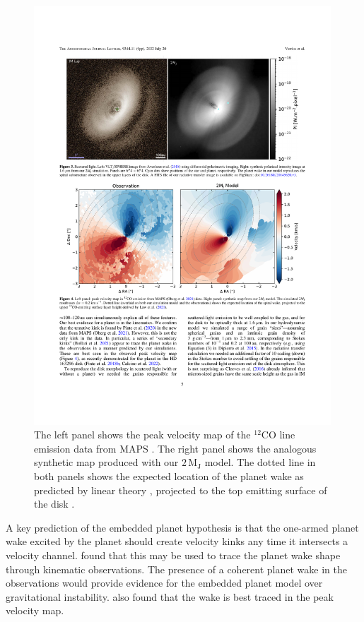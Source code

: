 \begin{figure}
    \centering
    \includegraphics[width = 0.99\textwidth]{figures/verrios_v0.pdf}
    \caption{The left panel shows the peak velocity map of the $^{12}$CO line emission data from MAPS \citep{oberg2021}. The right panel shows the analogous synthetic map produced with our $2 \, \mathrm{M_J}$ model. The dotted line in both panels shows the expected location of the planet wake as predicted by linear theory \citep{ogilvie2002}, projected to the top emitting surface of the disk \citep{pinte2018,law2021}.}
    \label{fig:verrios_v0}
\end{figure}

A key prediction of the embedded planet hypothesis is that the one-armed planet wake excited by the planet should create velocity kinks any time it intersects a velocity channel.
\citet{calcino2022} found that this may be used to trace the planet wake shape through kinematic observations.
The presence of a coherent planet wake in the observations would provide evidence for the embedded planet model over gravitational instability.
\citet{calcino2022} also found that the wake is best traced in the peak velocity map.


